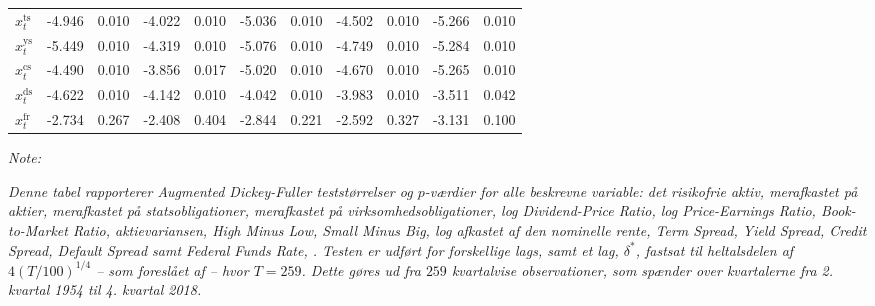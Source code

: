 \documentclass[
  a4paper,
  oneside]{memoir}
\begin{document}
\begin{landscape}
\begin{table}[!h]
\begin{threeparttable}
\begin{tabular}[t]{lrrrrrrrrrr}
$x_t^{\text{ts}}$ & -4.946 & 0.010 & -4.022 & 0.010 & -5.036 & 0.010 & -4.502 & 0.010 & -5.266 & 0.010\\
\rowcolor{gray!6}  $x_t^{\text{ys}}$ & -5.449 & 0.010 & -4.319 & 0.010 & -5.076 & 0.010 & -4.749 & 0.010 & -5.284 & 0.010\\
$x_t^{\text{cs}}$ & -4.490 & 0.010 & -3.856 & 0.017 & -5.020 & 0.010 & -4.670 & 0.010 & -5.265 & 0.010\\
\rowcolor{gray!6}  $x_t^{\text{ds}}$ & -4.622 & 0.010 & -4.142 & 0.010 & -4.042 & 0.010 & -3.983 & 0.010 & -3.511 & 0.042\\
$x_t^{\text{fr}}$ & -2.734 & 0.267 & -2.408 & 0.404 & -2.844 & 0.221 & -2.592 & 0.327 & -3.131 & 0.100\\
\bottomrule
\end{tabular}
\begin{tablenotes}
\item \textit{Note: } 
\item \textit{Denne tabel rapporterer Augmented Dickey-Fuller teststørrelser og $p$-værdier for alle beskrevne variable: det risikofrie aktiv, merafkastet på aktier, merafkastet på statsobligationer, merafkastet på virksomhedsobligationer, log Dividend-Price Ratio, log Price-Earnings Ratio, Book-to-Market Ratio, aktievariansen, High Minus Low, Small Minus Big, log afkastet af den nominelle rente, Term Spread, Yield Spread, Credit Spread, Default Spread samt Federal Funds Rate, \citep{Dickey1979}. Testen er udført for forskellige lags, samt et lag, $\delta^*$, fastsat til heltalsdelen af $4(T/100)^{1/4}$ -- som foreslået af \citep{Schwert1989} -- hvor $T=259$. Dette gøres ud fra $259$ kvartalvise observationer, som spænder over kvartalerne fra 2. kvartal 1954 til 4. kvartal 2018.}
\end{tablenotes}
\end{threeparttable}
\end{table}
\end{landscape}
\end{document}
